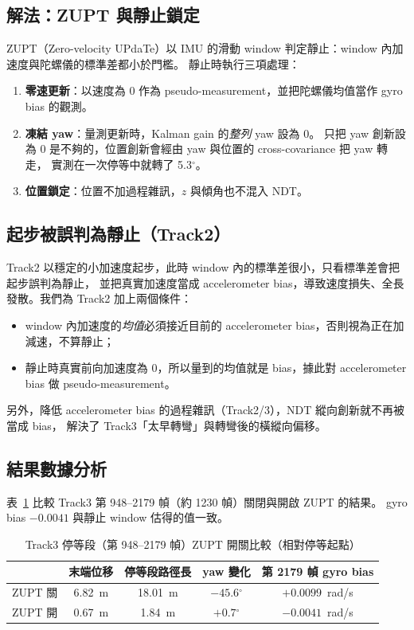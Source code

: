 \documentclass[11pt, a4paper]{article}
\newcommand{\dg}{$^{\circ}$}
\begin{document}
\subsection{解法：ZUPT 與靜止鎖定}
ZUPT（Zero-velocity UPdaTe）以 IMU 的滑動 window 判定靜止：window 內加速度與陀螺儀的標準差都小於門檻。
靜止時執行三項處理：
\begin{enumerate}
  \item \textbf{零速更新}：以速度為 0 作為 pseudo-measurement，並把陀螺儀均值當作 gyro bias 的觀測。
  \item \textbf{凍結 yaw}：量測更新時，Kalman gain 的\emph{整列} yaw 設為 0。
        只把 yaw 創新設為 0 是不夠的，位置創新會經由 yaw 與位置的 cross-covariance 把 yaw 轉走，
        實測在一次停等中就轉了 5.3\dg。
  \item \textbf{位置鎖定}：位置不加過程雜訊，$z$ 與傾角也不混入 NDT。
\end{enumerate}

\subsection{起步被誤判為靜止（Track2）}
Track2 以穩定的小加速度起步，此時 window 內的標準差很小，只看標準差會把起步誤判為靜止，
並把真實加速度當成 accelerometer bias，導致速度損失、全長發散。我們為 Track2 加上兩個條件：
\begin{itemize}
  \item window 內加速度的\emph{均值}必須接近目前的 accelerometer bias，否則視為正在加減速，不算靜止；
  \item 靜止時真實前向加速度為 0，所以量到的均值就是 bias，據此對 accelerometer bias 做 pseudo-measurement。
\end{itemize}
另外，降低 accelerometer bias 的過程雜訊（Track2/3），NDT 縱向創新就不再被當成 bias，
解決了 Track3「太早轉彎」與轉彎後的橫縱向偏移。

\subsection{結果數據分析}
表~\ref{tab:zupt} 比較 Track3 第 948--2179 幀（約 1230 幀）關閉與開啟 ZUPT 的結果。
gyro bias $-0.0041$ 與靜止 window 估得的值一致。

\begin{table}[H]
\centering\small
\caption{Track3 停等段（第 948--2179 幀）ZUPT 開關比較（相對停等起點）}\label{tab:zupt}
\begin{tabular}{@{}lcccc@{}}
\toprule
 & 末端位移 & 停等段路徑長 & yaw 變化 & 第 2179 幀 gyro bias\\
\midrule
ZUPT 關 & 6.82~m & 18.01~m & $-45.6$\dg & $+0.0099$~rad/s\\
ZUPT 開 & 0.67~m & 1.84~m  & $+0.7$\dg  & $-0.0041$~rad/s\\
\bottomrule
\end{tabular}
\end{table}
\end{document}
